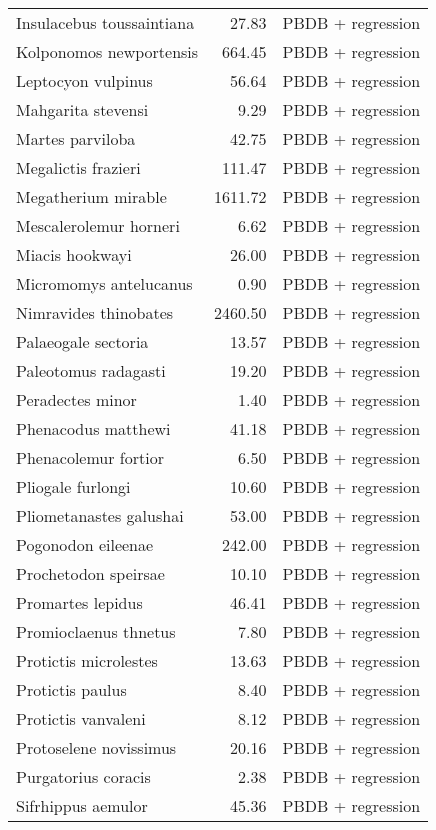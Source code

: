 \begin{table}[ht]
\begin{tabular}{lrl}
  Insulacebus toussaintiana & 27.83 & PBDB + regression \\ 
  Kolponomos newportensis & 664.45 & PBDB + regression \\ 
  Leptocyon vulpinus & 56.64 & PBDB + regression \\ 
  Mahgarita stevensi & 9.29 & PBDB + regression \\ 
  Martes parviloba & 42.75 & PBDB + regression \\ 
  Megalictis frazieri & 111.47 & PBDB + regression \\ 
  Megatherium mirable & 1611.72 & PBDB + regression \\ 
  Mescalerolemur horneri & 6.62 & PBDB + regression \\ 
  Miacis hookwayi & 26.00 & PBDB + regression \\ 
  Micromomys antelucanus & 0.90 & PBDB + regression \\ 
  Nimravides thinobates & 2460.50 & PBDB + regression \\ 
  Palaeogale sectoria & 13.57 & PBDB + regression \\ 
  Paleotomus radagasti & 19.20 & PBDB + regression \\ 
  Peradectes minor & 1.40 & PBDB + regression \\ 
  Phenacodus matthewi & 41.18 & PBDB + regression \\ 
  Phenacolemur fortior & 6.50 & PBDB + regression \\ 
  Pliogale furlongi & 10.60 & PBDB + regression \\ 
  Pliometanastes galushai & 53.00 & PBDB + regression \\ 
  Pogonodon eileenae & 242.00 & PBDB + regression \\ 
  Prochetodon speirsae & 10.10 & PBDB + regression \\ 
  Promartes lepidus & 46.41 & PBDB + regression \\ 
  Promioclaenus thnetus & 7.80 & PBDB + regression \\ 
  Protictis microlestes & 13.63 & PBDB + regression \\ 
  Protictis paulus & 8.40 & PBDB + regression \\ 
  Protictis vanvaleni & 8.12 & PBDB + regression \\ 
  Protoselene novissimus & 20.16 & PBDB + regression \\ 
  Purgatorius coracis & 2.38 & PBDB + regression \\ 
  Sifrhippus aemulor & 45.36 & PBDB + regression \\ 

\end{tabular}
\end{table}

